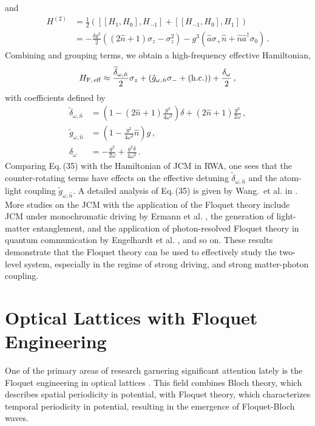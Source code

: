 \documentclass[reprint, amsmath, amssymb, aps]{revtex4-2}
\newcommand{\that}[1]{\widetilde{#1}}
\begin{document}
and 
\begin{align*}
H^{(2)} &= \frac{1}{2}\left( [[H_1,H_0], H_{-1}] + [[H_{-1},H_0], H_1]\right)\\
&=-\frac{\delta g^2}{2}\left( (2\hat{n}+1) \sigma_z - \sigma_z^2\right) - g^3\left( \hat{a}\sigma_+ \hat{n} + \hat{n}\hat{a}^\dagger \sigma_0\right)\,. \tag{36}
\end{align*}
Combining and grouping terms, we obtain a high-frequency effective Hamiltonian,
\begin{align}
H_{\text{F,\,eff}} \approx 
\frac{\that{\delta}_{\omega, \hat{n}}}{2} \sigma_z + \left( \hat{g}_{\omega, \hat{n}} \sigma_- + (\text{h.c.})\right) + \frac{\delta_{\omega}}{2}\,,
\end{align}
with coefficients defined by
\begin{align}
\that{\delta}_{\omega, \hat{n}} &=
\left(1- (2\hat{n}+1)\frac{g^2}{4\omega^2} \right)\delta + (2\hat{n}+1) \frac{g^2}{2\omega}\,, \\
\that{g}_{\omega, \hat{n}} &= \left(1 - \frac{g^2}{4\omega^2}\hat{n}  \right)g\,,\\
\delta_{\omega} &= -\frac{g^2}{2\omega} + \frac{g^2\delta}{4\omega^2}\,.
\end{align}
Comparing Eq.\,(35) with the Hamiltonian of JCM in RWA, one sees that the counter-rotating terms have effects on the effective detuning $\that{\delta}_{\omega, \hat{n}}$ and the atom-light coupling $\that{g}_{\omega, \hat{n}}$. A detailed analysis of Eq.\,(35) is given by Wang.\, et al. in \cite{Wang}.\\

More studies on the JCM with the application of the Floquet theory include JCM under monochromatic driving by Ermann et al. \cite{Ermann}, the generation of light-matter entanglement, and the application of photon-resolved Floquet theory in quantum communication by Engelhardt et al. \cite{Engelhardt}, and so on. These results demonstrate that the Floquet theory can be used to effectively study the two-level system, especially in the regime of strong driving, and strong matter-photon coupling. \\


\section{Optical Lattices with Floquet Engineering}
One of the primary areas of research garnering significant attention lately is the Floquet engineering in optical lattices \cite{Sandholzer, Subhankar, Wu, Sandholzer2}. This field combines Bloch theory, which describes spatial periodicity in potential, with Floquet theory, which characterizes temporal periodicity in potential, resulting in the emergence of Floquet-Bloch waves.\\
\end{document}
